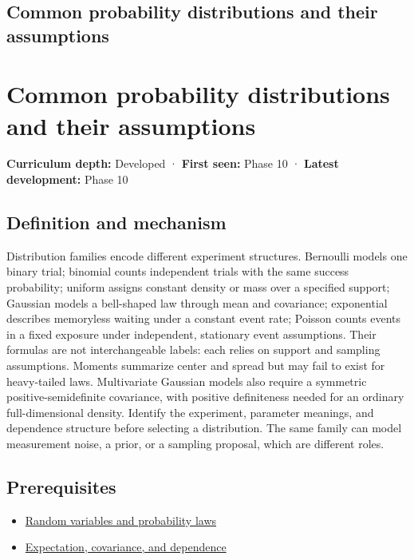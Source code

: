\hypertarget{appendix-a2360b435383}{}
\section*{Common probability distributions and their assumptions}
\chapter{Common probability distributions and their assumptions}\label{appendix-a2360b435383-common-probability-distributions-and-their-assumptions}

\textbf{Curriculum depth:} Developed · \textbf{First seen:} Phase 10 · \textbf{Latest development:} Phase 10

\section{Definition and mechanism}\label{appendix-a2360b435383-definition-and-mechanism}

Distribution families encode different experiment structures. Bernoulli models one binary trial; binomial counts independent trials with the same success probability; uniform assigns constant density or mass over a specified support; Gaussian models a bell-shaped law through mean and covariance; exponential describes memoryless waiting under a constant event rate; Poisson counts events in a fixed exposure under independent, stationary event assumptions. Their formulas are not interchangeable labels: each relies on support and sampling assumptions. Moments summarize center and spread but may fail to exist for heavy-tailed laws. Multivariate Gaussian models also require a symmetric positive-semidefinite covariance, with positive definiteness needed for an ordinary full-dimensional density. Identify the experiment, parameter meanings, and dependence structure before selecting a distribution. The same family can model measurement noise, a prior, or a sampling proposal, which are different roles.

\section{Prerequisites}\label{appendix-a2360b435383-prerequisites}

\begin{itemize}
\tightlist
\item
  \hyperref[appendix-4d0203f7944f]{Random variables and probability laws}
\item
  \hyperref[appendix-54c383df9992]{Expectation, covariance, and dependence}
\end{itemize}

